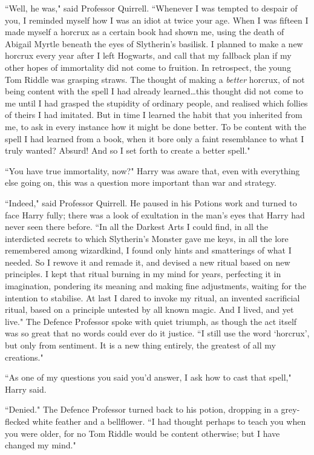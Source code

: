 ``Well, he was," said Professor Quirrell. ``Whenever I was tempted to despair of you, I reminded myself how I was an idiot at twice your age. When I was fifteen I made myself a horcrux as a certain book had shown me, using the death of Abigail Myrtle beneath the eyes of Slytherin's basilisk. I planned to make a new horcrux every year after I left Hogwarts, and call that my fallback plan if my other hopes of immortality did not come to fruition. In retrospect, the young Tom Riddle was grasping straws. The thought of making a \emph{better} horcrux, of not being content with the spell I had already learned…this thought did not come to me until I had grasped the stupidity of ordinary people, and realised which follies of theirs I had imitated. But in time I learned the habit that you inherited from me, to ask in every instance how it might be done better. To be content with the spell I had learned from a book, when it bore only a faint resemblance to what I truly wanted? Absurd! And so I set forth to create a better spell."

``You have true immortality, now?" Harry was aware that, even with everything else going on, this was a question more important than war and strategy.

``Indeed," said Professor Quirrell. He paused in his Potions work and turned to face Harry fully; there was a look of exultation in the man's eyes that Harry had never seen there before. ``In all the Darkest Arts I could find, in all the interdicted secrets to which Slytherin's Monster gave me keys, in all the lore remembered among wizardkind, I found only hints and smatterings of what I needed. So I rewove it and remade it, and devised a new ritual based on new principles. I kept that ritual burning in my mind for years, perfecting it in imagination, pondering its meaning and making fine adjustments, waiting for the intention to stabilise. At last I dared to invoke my ritual, an invented sacrificial ritual, based on a principle untested by all known magic. And I lived, and yet live." The Defence Professor spoke with quiet triumph, as though the act itself was so great that no words could ever do it justice. ``I still use the word `horcrux', but only from sentiment. It is a new thing entirely, the greatest of all my creations."

``As one of my questions you said you'd answer, I ask how to cast that spell," Harry said.

``Denied." The Defence Professor turned back to his potion, dropping in a grey-flecked white feather and a bellflower. ``I had thought perhaps to teach you when you were older, for no Tom Riddle would be content otherwise; but I have changed my mind."

